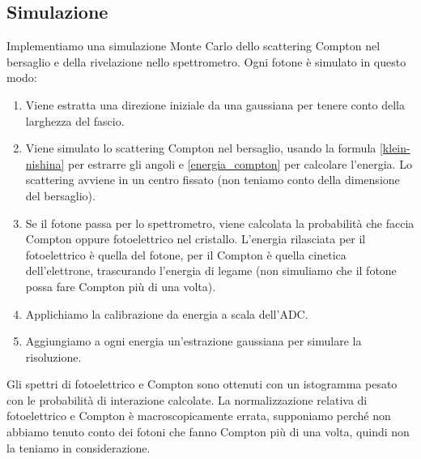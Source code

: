 \subsection{Simulazione}

Implementiamo una simulazione Monte Carlo dello scattering Compton nel bersaglio
e della rivelazione nello spettrometro.
Ogni fotone è simulato in questo modo:
\begin{enumerate}
	\item Viene estratta una direzione iniziale da una gaussiana per tenere conto della larghezza del fascio.
	\item Viene simulato lo scattering Compton nel bersaglio,
	usando la formula \eqref{klein-nishina} per estrarre gli angoli e \eqref{energia_compton} per calcolare l'energia.
	Lo scattering avviene in un centro fissato (non teniamo conto della dimensione del bersaglio).
	\item Se il fotone passa per lo spettrometro,
	viene calcolata la probabilità che faccia Compton oppure fotoelettrico nel cristallo.
	L'energia rilasciata per il fotoelettrico è quella del fotone,
	per il Compton è quella cinetica dell'elettrone, trascurando l'energia di legame
	(non simuliamo che il fotone possa fare Compton più di una volta).
	\item Applichiamo la calibrazione da energia a scala dell'ADC.
	\item Aggiungiamo a ogni energia un'estrazione gaussiana
	per simulare la risoluzione.
\end{enumerate}
Gli spettri di fotoelettrico e Compton sono ottenuti con un istogramma pesato con le probabilità di interazione calcolate.
La normalizzazione relativa di fotoelettrico e Compton è macroscopicamente errata,
supponiamo perché non abbiamo tenuto conto dei fotoni che fanno Compton più di una volta,
quindi non la teniamo in considerazione.
